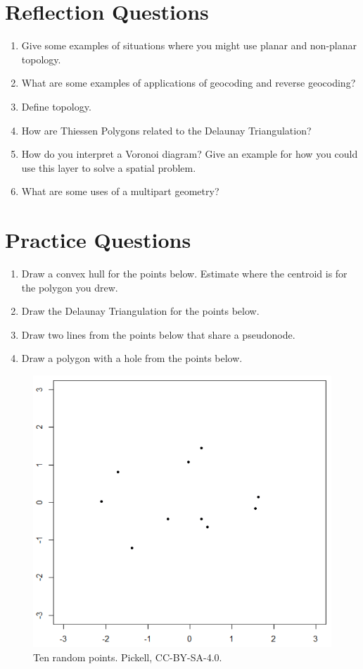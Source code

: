 \documentclass[
]{book}
\providecommand{\tightlist}{%
  \setlength{\itemsep}{0pt}\setlength{\parskip}{0pt}}
\begin{document}
\hypertarget{reflection-questions-4}{%
\section*{Reflection Questions}\label{reflection-questions-4}}

\begin{enumerate}
\def\labelenumi{\arabic{enumi}.}
\tightlist
\item
  Give some examples of situations where you might use planar and non-planar topology.
\item
  What are some examples of applications of geocoding and reverse geocoding?
\item
  Define topology.
\item
  How are Thiessen Polygons related to the Delaunay Triangulation?
\item
  How do you interpret a Voronoi diagram? Give an example for how you could use this layer to solve a spatial problem.
\item
  What are some uses of a multipart geometry?
\end{enumerate}

\hypertarget{practice-questions-3}{%
\section*{Practice Questions}\label{practice-questions-3}}

\begin{enumerate}
\def\labelenumi{\arabic{enumi}.}
\tightlist
\item
  Draw a convex hull for the points below. Estimate where the centroid is for the polygon you drew.
\item
  Draw the Delaunay Triangulation for the points below.
\item
  Draw two lines from the points below that share a pseudonode.
\item
  Draw a polygon with a hole from the points below.
\end{enumerate}

\begin{figure}
\includegraphics[width=0.75\linewidth]{images/07-scatterplot} \caption{Ten random points. Pickell, CC-BY-SA-4.0.}\label{fig:7-scatterplot}
\end{figure}
\end{document}
